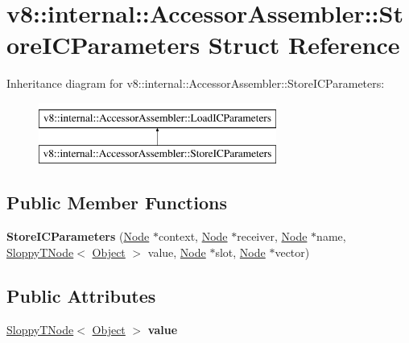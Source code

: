\hypertarget{structv8_1_1internal_1_1AccessorAssembler_1_1StoreICParameters}{}\section{v8\+:\+:internal\+:\+:Accessor\+Assembler\+:\+:Store\+I\+C\+Parameters Struct Reference}
\label{structv8_1_1internal_1_1AccessorAssembler_1_1StoreICParameters}
Inheritance diagram for v8\+:\+:internal\+:\+:Accessor\+Assembler\+:\+:Store\+I\+C\+Parameters\+:\begin{figure}[H]
\begin{center}
\leavevmode
\includegraphics[height=2.000000cm]{structv8_1_1internal_1_1AccessorAssembler_1_1StoreICParameters}
\end{center}
\end{figure}
\subsection*{Public Member Functions}
\begin{DoxyCompactItemize}
\item 
\mbox{\label{structv8_1_1internal_1_1AccessorAssembler_1_1StoreICParameters_a0ab22216d407627e51647194d1de9410}} 
{\bfseries Store\+I\+C\+Parameters} (\mbox{\hyperlink{classv8_1_1internal_1_1compiler_1_1Node}{Node}} $\ast$context, \mbox{\hyperlink{classv8_1_1internal_1_1compiler_1_1Node}{Node}} $\ast$receiver, \mbox{\hyperlink{classv8_1_1internal_1_1compiler_1_1Node}{Node}} $\ast$name, \mbox{\hyperlink{classv8_1_1internal_1_1compiler_1_1SloppyTNode}{Sloppy\+T\+Node}}$<$ \mbox{\hyperlink{classv8_1_1internal_1_1Object}{Object}} $>$ value, \mbox{\hyperlink{classv8_1_1internal_1_1compiler_1_1Node}{Node}} $\ast$slot, \mbox{\hyperlink{classv8_1_1internal_1_1compiler_1_1Node}{Node}} $\ast$vector)
\end{DoxyCompactItemize}
\subsection*{Public Attributes}
\begin{DoxyCompactItemize}
\item 
\mbox{\label{structv8_1_1internal_1_1AccessorAssembler_1_1StoreICParameters_ac89a8b0b52da6b09d3e009476d9a600a}} 
\mbox{\hyperlink{classv8_1_1internal_1_1compiler_1_1SloppyTNode}{Sloppy\+T\+Node}}$<$ \mbox{\hyperlink{classv8_1_1internal_1_1Object}{Object}} $>$ {\bfseries value}
\end{DoxyCompactItemize}


